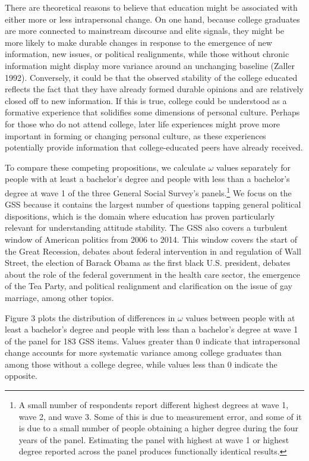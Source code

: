 \documentclass[
  12pt,
]{article}
\begin{document}
There are theoretical reasons to believe that education might be
associated with either more or less intrapersonal change. On one hand,
because college graduates are more connected to mainstream discourse and
elite signals, they might be more likely to make durable changes in
response to the emergence of new information, new issues, or political
realignments, while those without chronic information might display more
variance around an unchanging baseline (Zaller 1992). Conversely, it
could be that the observed stability of the college educated reflects
the fact that they have already formed durable opinions and are
relatively closed off to new information. If this is true, college could
be understood as a formative experience that solidifies some dimensions
of personal culture. Perhaps for those who do not attend college, later
life experiences might prove more important in forming or changing
personal culture, as these experiences potentially provide information
that college-educated peers have already received.

To compare these competing propositions, we calculate \(\omega\) values
separately for people with at least a bachelor's degree and people with
less than a bachelor's degree at wave 1 of the three General Social
Survey's panels.\footnote{A small number of respondents report different
  highest degrees at wave 1, wave 2, and wave 3. Some of this is due to
  measurement error, and some of it is due to a small number of people
  obtaining a higher degree during the four years of the panel.
  Estimating the panel with highest at wave 1 or highest degree reported
  across the panel produces functionally identical results.} We focus on
the GSS because it contains the largest number of questions tapping
general political dispositions, which is the domain where education has
proven particularly relevant for understanding attitude stability. The
GSS also covers a turbulent window of American politics from 2006 to
2014. This window covers the start of the Great Recession, debates about
federal intervention in and regulation of Wall Street, the election of
Barack Obama as the first black U.S. president, debates about the role
of the federal government in the health care sector, the emergence of
the Tea Party, and political realignment and clarification on the issue
of gay marriage, among other topics.

Figure 3 plots the distribution of differences in \(\omega\) values
between people with at least a bachelor's degree and people with less
than a bachelor's degree at wave 1 of the panel for 183 GSS items.
Values greater than 0 indicate that intrapersonal change accounts for
more systematic variance among college graduates than among those
without a college degree, while values less than 0 indicate the
opposite.
\end{document}
